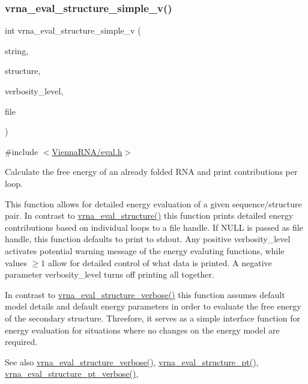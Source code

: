 \subsubsection{\texorpdfstring{vrna\_eval\_structure\_simple\_v()}{vrna\_eval\_structure\_simple\_v()}}
{\footnotesize\ttfamily int vrna\+\_\+eval\+\_\+structure\+\_\+simple\+\_\+v (\begin{DoxyParamCaption}\item[{const char $\ast$}]{string,  }\item[{const char $\ast$}]{structure,  }\item[{int}]{verbosity\+\_\+level,  }\item[{F\+I\+LE $\ast$}]{file }\end{DoxyParamCaption})}



{\ttfamily \#include $<$\mbox{\hyperlink{eval_8h}{Vienna\+R\+N\+A/eval.\+h}}$>$}



Calculate the free energy of an already folded R\+NA and print contributions per loop. 

This function allows for detailed energy evaluation of a given sequence/structure pair. In contrast to \mbox{\hyperlink{group__eval_ga58f199f1438d794a265f3b27fc8ea631}{vrna\+\_\+eval\+\_\+structure()}} this function prints detailed energy contributions based on individual loops to a file handle. If N\+U\+LL is passed as file handle, this function defaults to print to stdout. Any positive {\ttfamily verbosity\+\_\+level} activates potential warning message of the energy evaluting functions, while values $ \ge 1 $ allow for detailed control of what data is printed. A negative parameter {\ttfamily verbosity\+\_\+level} turns off printing all together.

In contrast to \mbox{\hyperlink{group__eval_ga0928d699d310178f84ee2351034e5cb5}{vrna\+\_\+eval\+\_\+structure\+\_\+verbose()}} this function assumes default model details and default energy parameters in order to evaluate the free energy of the secondary structure. Threefore, it serves as a simple interface function for energy evaluation for situations where no changes on the energy model are required.

\begin{DoxySeeAlso}{See also}
\mbox{\hyperlink{group__eval_ga0928d699d310178f84ee2351034e5cb5}{vrna\+\_\+eval\+\_\+structure\+\_\+verbose()}}, \mbox{\hyperlink{group__eval_gadbd09372ddfd7a450bbd590c96a6bfe4}{vrna\+\_\+eval\+\_\+structure\+\_\+pt()}}, \mbox{\hyperlink{group__eval_ga8a517cfeeae8c376ae7b1e0c401d38b4}{vrna\+\_\+eval\+\_\+structure\+\_\+pt\+\_\+verbose()}},
\end{DoxySeeAlso}


